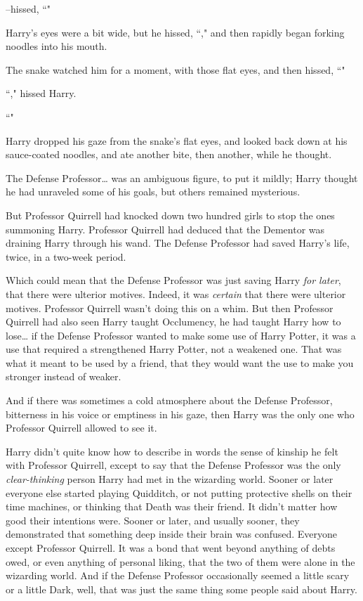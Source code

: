 \---hissed, ``"

Harry's eyes were a bit wide, but he hissed, ``," and then rapidly began forking noodles into his mouth.

The snake watched him for a moment, with those flat eyes, and then hissed, ``"

``," hissed Harry.

``"

Harry dropped his gaze from the snake's flat eyes, and looked back down at his sauce-coated noodles, and ate another bite, then another, while he thought.

The Defense Professor{\ldots} was an ambiguous figure, to put it mildly; Harry thought he had unraveled some of his goals, but others remained mysterious.

But Professor Quirrell had knocked down two hundred girls to stop the ones summoning Harry. Professor Quirrell had deduced that the Dementor was draining Harry through his wand. The Defense Professor had saved Harry's life, twice, in a two-week period.

Which could mean that the Defense Professor was just saving Harry \emph{for later}, that there were ulterior motives. Indeed, it was \emph{certain} that there were ulterior motives. Professor Quirrell wasn't doing this on a whim. But then Professor Quirrell had also seen Harry taught Occlumency, he had taught Harry how to lose{\ldots} if the Defense Professor wanted to make some use of Harry Potter, it was a use that required a strengthened Harry Potter, not a weakened one. That was what it meant to be used by a friend, that they would want the use to make you stronger instead of weaker.

And if there was sometimes a cold atmosphere about the Defense Professor, bitterness in his voice or emptiness in his gaze, then Harry was the only one who Professor Quirrell allowed to see it.

Harry didn't quite know how to describe in words the sense of kinship he felt with Professor Quirrell, except to say that the Defense Professor was the only \emph{clear-thinking} person Harry had met in the wizarding world. Sooner or later everyone else started playing Quidditch, or not putting protective shells on their time machines, or thinking that Death was their friend. It didn't matter how good their intentions were. Sooner or later, and usually sooner, they demonstrated that something deep inside their brain was confused. Everyone except Professor Quirrell. It was a bond that went beyond anything of debts owed, or even anything of personal liking, that the two of them were alone in the wizarding world. And if the Defense Professor occasionally seemed a little scary or a little Dark, well, that was just the same thing some people said about Harry.

